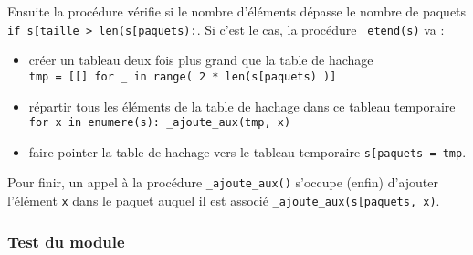 \documentclass[a4paper,17pt]{extarticle}
\providecommand{\tightlist}{%
      \setlength{\itemsep}{0pt}\setlength{\parskip}{0pt}}
\begin{document}
Ensuite la procédure vérifie si le nombre d'éléments dépasse le nombre
de paquets
\texttt{if\ s{[}\textquotesingle{}taille\textquotesingle{}{]}\ \textgreater{}\ len(s{[}\textquotesingle{}paquets\textquotesingle{}{]}):}.
Si c'est le cas, la procédure \texttt{\_etend(s)} va :

\begin{itemize}
\tightlist
\item
  créer un tableau deux fois plus grand que la table de hachage
  \texttt{tmp\ =\ {[}{[}{]}\ for\ \_\ in\ range(\ 2\ *\ len(s{[}\textquotesingle{}paquets\textquotesingle{}{]})\ ){]}}
\item
  répartir tous les éléments de la table de hachage dans ce tableau
  temporaire \texttt{for\ x\ in\ enumere(s):\ \_ajoute\_aux(tmp,\ x)}
\item
  faire pointer la table de hachage vers le tableau temporaire
  \texttt{s{[}\textquotesingle{}paquets\textquotesingle{}{]}\ =\ tmp}.
\end{itemize}

Pour finir, un appel à la procédure \texttt{\_ajoute\_aux()} s'occupe
(enfin) d'ajouter l'élément \texttt{x} dans le paquet auquel il est
associé
\texttt{\_ajoute\_aux(s{[}\textquotesingle{}paquets\textquotesingle{}{]},\ x)}.

    \hypertarget{test-du-module}{%
\subsubsection{Test du module}\label{test-du-module}}
\end{document}
